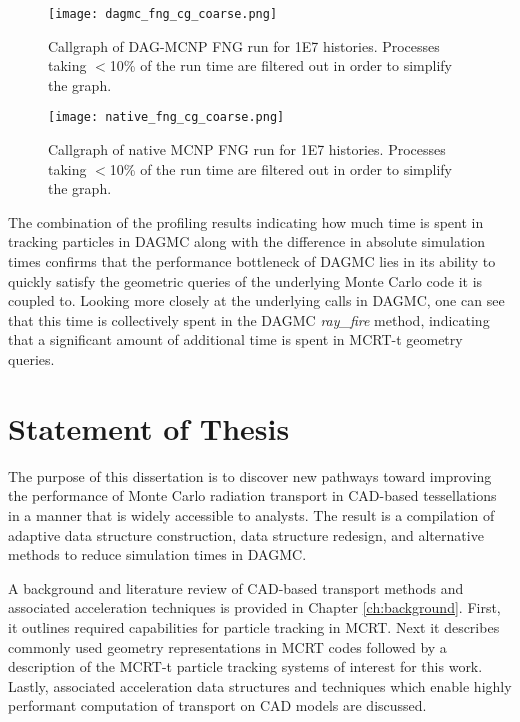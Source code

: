 \begin{figure}[H]
  \centering
  \caption[Callgraph of a DAG-MCNP simulation.]{Callgraph of DAG-MCNP FNG run for \num{1E7} histories. Processes taking
    $<$10\% of the run time are filtered out in order to simplify the graph.}
  \label{dagmc-fng-coarse}
  \texttt{[image: dagmc\_fng\_cg\_coarse.png]}
\end{figure}

\begin{figure}[H]
  \centering
  \caption[Callgraph of a native MCNP simulation.]{Callgraph of native MCNP FNG run for \num{1E7} histories. Processes taking
    $<$10\% of the run time are filtered out in order to simplify the graph.}
  \label{mcnp-fng-coarse}
  \texttt{[image: native\_fng\_cg\_coarse.png]}
\end{figure}

The combination of the profiling results indicating how much time is spent in
tracking particles in DAGMC along with the difference in absolute simulation times
confirms that the performance bottleneck of DAGMC lies in its ability to quickly
satisfy the geometric queries of the underlying Monte Carlo code it is coupled
to. Looking more closely at the underlying calls in DAGMC, one can see that this
time is collectively spent in the DAGMC \textit{ray\_fire} method,
indicating that a significant amount of additional time is spent in
MCRT-t geometry queries.


\section{Statement of Thesis}

The purpose of this dissertation is to discover new pathways toward improving
the performance of Monte Carlo radiation transport in CAD-based tessellations in
a manner that is widely accessible to analysts. The result is a compilation of
adaptive data structure construction, data structure redesign, and alternative
methods to reduce simulation times in DAGMC.

A background and literature review of CAD-based transport methods and associated
acceleration techniques is provided in Chapter \ref{ch:background}. First, it
outlines required capabilities for particle tracking in MCRT. Next it describes 
commonly used geometry representations in MCRT codes followed by a description
of the MCRT-t particle tracking systems of interest for this work. Lastly,
associated acceleration data structures and techniques which enable highly performant
computation of transport on CAD models are discussed.

